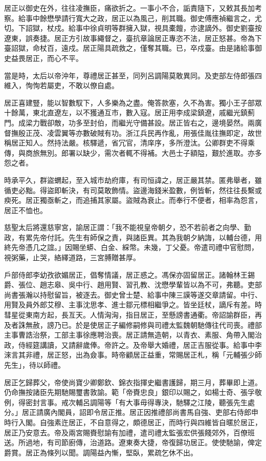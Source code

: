 \begin{pinyinscope}
居正以御史在外，往往凌撫臣，痛欲折之。一事小不合，詬責隨下，又敕其長加考察。給事中餘懋學請行寬大之政，居正以為風己，削其職。御史傅應禎繼言之，尤切。下詔獄，杖戍。給事中徐貞明等群擁入獄，視具橐饘，亦逮謫外。御史劉臺按遼東，誤奏捷。居正方引故事繩督之，臺抗章論居正專恣不法，居正怒甚。帝為下臺詔獄，命杖百，遠戍。居正陽具疏救之，僅奪其職。已，卒戍臺。由是諸給事御史益畏居正，而心不平。

當是時，太后以帝沖年，尊禮居正甚至，同列呂調陽莫敢異同。及吏部左侍郎張四維入，恂恂若屬吏，不敢以僚自處。

居正喜建豎，能以智數馭下，人多樂為之盡。俺答款塞，久不為害。獨小王子部眾十餘萬，東北直遼左，以不獲通互市，數入寇。居正用李成梁鎮遼，戚繼光鎮薊門。成梁力戰卻敵，功多至封伯，而繼光守備甚設。居正皆右之，邊境晏然。兩廣督撫殷正茂、凌雲翼等亦數破賊有功。浙江兵民再作亂，用張佳胤往撫即定，故世稱居正知人。然持法嚴。核驛遞，省冗官，清庠序，多所澄汰。公卿群吏不得乘傳，與商旅無別。郎署以缺少，需次者輒不得補。大邑士子額隘，艱於進取。亦多怨之者。

時承平久，群盜蝟起，至入城市劫府庫，有司恒諱之，居正嚴其禁。匿弗舉者，雖循吏必黜。得盜即斬決，有司莫敢飾情。盜邊海錢米盈數，例皆斬，然往往長繫或瘐死。居正獨亟斬之，而追捕其家屬。盜賊為衰止。而奉行不便者，相率為怨言，居正不恤也。

慈聖太后將還慈寧宮，諭居正謂：「我不能視皇帝朝夕，恐不若前者之向學、勤政，有累先帝付託。先生有師保之責，與諸臣異。其為我朝夕納誨，以輔台德，用終先帝憑几之誼。」因賜坐蟒、白金、綵幣。未幾，丁父憂。帝遣司禮中官慰問，視粥藥，止哭，絡繹道路，三宮膊贈甚厚。

戶部侍郎李幼孜欲媚居正，倡奪情議，居正惑之。馮保亦固留居正。諸翰林王錫爵、張位、趙志皋、吳中行、趙用賢、習孔教、沈懋學輩皆以為不可，弗聽。吏部尚書張瀚以持慰留旨，被逐去。御史曾士楚、給事中陳三謨等遂交章請留。中行、用賢及員外郎艾穆、主事沈思孝、進士鄒元標相繼爭之。皆坐廷杖，謫斥有差。時彗星從東南方起，長亙天。人情洶洶，指目居正，至懸謗書通衢。帝詔諭群臣，再及者誅無赦，謗乃已。於是使居正子編修嗣修與司禮太監魏朝馳傳往代司喪。禮部主事曹誥治祭，工部主事徐應聘治喪。居正請無造朝，以青衣、素服、角帶入閣治政，侍經筵講讀，又請辭歲俸。帝許之。及帝舉大婚禮，居正吉服從事。給事中李淶言其非禮，居正怒，出為僉事。時帝顧居正益重，常賜居正札，稱「元輔張少師先生」，待以師禮。

居正乞歸葬父，帝使尚寶少卿鄭欽、錦衣指揮史繼書護歸，期三月，葬畢即上道。仍命撫按諸臣先期馳賜璽書敦諭。範「帝賚忠良」銀印以賜之，如楊士奇、張孚敬例，得密封言事。戒次輔呂調陽等「有大事毋得專決，馳驛之江陵，聽張先生處分。」居正請廣內閣員，詔即令居正推。居正因推禮部尚書馬自強、吏部右侍郎申時行入閣。自強素迕居正，不自意得之，頗德居正，而時行與四維皆自暱於居正，居正乃安意去。帝及兩宮賜賚慰諭有加禮，遣司禮太監張宏供張餞郊外，百僚班送。所過地，有司節廚傳，治道路。遼東奏大捷，帝復歸功居正。使使馳諭，俾定爵賞。居正為條列以聞。調陽益內慚，堅臥，累疏乞休不出。


\end{pinyinscope}
